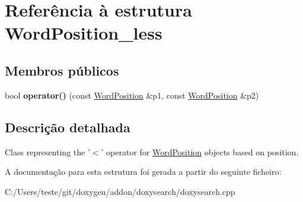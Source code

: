 \hypertarget{struct_word_position__less}{\section{Referência à estrutura Word\-Position\-\_\-less}
\label{struct_word_position__less}
}
\subsection*{Membros públicos}
\begin{DoxyCompactItemize}
\item 
\hypertarget{struct_word_position__less_a4e2f600d7b6b301a956a150ae09f8a92}{bool {\bfseries operator()} (const \hyperlink{struct_word_position}{Word\-Position} \&p1, const \hyperlink{struct_word_position}{Word\-Position} \&p2)}\label{struct_word_position__less_a4e2f600d7b6b301a956a150ae09f8a92}

\end{DoxyCompactItemize}


\subsection{Descrição detalhada}
Class representing the '$<$' operator for \hyperlink{struct_word_position}{Word\-Position} objects based on position. 

A documentação para esta estrutura foi gerada a partir do seguinte ficheiro\-:\begin{DoxyCompactItemize}
\item 
C\-:/\-Users/teste/git/doxygen/addon/doxysearch/doxysearch.\-cpp\end{DoxyCompactItemize}
